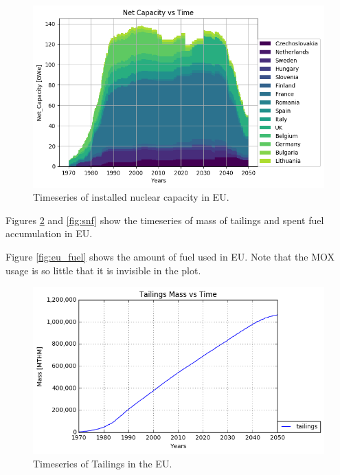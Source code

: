 \begin{figure}[htbp!]
	\begin{center}
		\includegraphics[scale=0.7]{./images/eu_future/power_plot.png}
	\end{center}
	\caption{Timeseries of installed nuclear capacity in EU.}
	\label{fig:eu_pow}
\end{figure}

Figures \ref{fig:eu_tail} and \ref{fig:snf} show the 
timeseries of mass of tailings and spent fuel accumulation in EU.

Figure \ref{fig:eu_fuel} shows the amount of fuel used in EU.
Note that the MOX usage is so little that it is invisible in the
plot. 


\begin{figure}[htbp!]
	\begin{center}
		\includegraphics[scale=0.7]{./images/eu_future/tailings.png}
	\end{center}
	\caption{Timeseries of Tailings in the EU.}
	\label{fig:eu_tail}
\end{figure}

